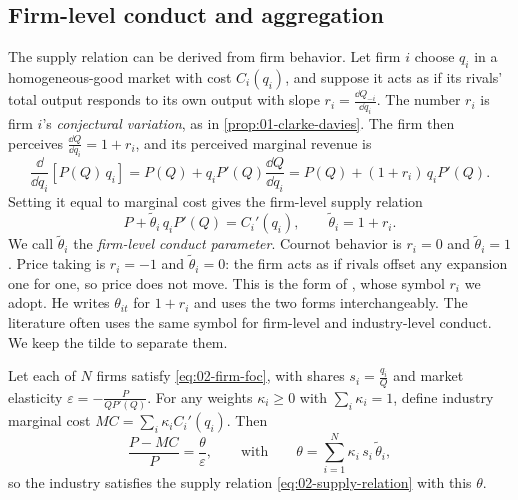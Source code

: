 \subsection{Firm-level conduct and aggregation}\label{sec:02-aggregation}

The supply relation can be derived from firm behavior. Let firm $i$ choose $q_i$ in a homogeneous-good market with
cost $C_i(q_i)$, and suppose it acts as if its rivals' total output responds to its own output with slope
$r_i = \frac{\dd Q_{-i}}{\dd q_i}$. The number $r_i$ is firm $i$'s \emph{conjectural variation}, as in
\cref{prop:01-clarke-davies}. The firm then perceives $\frac{\dd Q}{\dd q_i} = 1 + r_i$, and its perceived marginal
revenue is
\begin{equation*}
\frac{\dd}{\dd q_i}\left[P(Q)\, q_i\right] = P(Q) + q_i P'(Q)\frac{\dd Q}{\dd q_i} = P(Q) + (1 + r_i)\, q_i P'(Q) .
\end{equation*}
Setting it equal to marginal cost gives the firm-level supply relation
\begin{equation}\label{eq:02-firm-foc}
P + \tilde\theta_i\, q_i P'(Q) = C_i'(q_i), \qquad \tilde\theta_i = 1 + r_i .
\end{equation}
We call $\tilde\theta_i$ the \emph{firm-level conduct parameter}. Cournot behavior is $r_i = 0$ and
$\tilde\theta_i = 1$. Price taking is $r_i = -1$ and $\tilde\theta_i = 0$: the firm acts as if rivals offset any
expansion one for one, so price does not move. This is the form of \citet[eqs.~(12) and (14),
pp.~1027--1028]{Bresnahan1989}, whose symbol $r_i$ we adopt. He writes $\theta_{it}$ for $1 + r_i$ and uses the two
forms interchangeably. The literature often uses the same symbol for firm-level and industry-level conduct. We keep
the tilde to separate them.

\begin{proposition}\label{prop:02-theta-aggregate}
Let each of $N$ firms satisfy \eqref{eq:02-firm-foc}, with shares $s_i = \frac{q_i}{Q}$ and market elasticity
$\varepsilon = -\frac{P}{Q P'(Q)}$. For any weights $\kappa_i \ge 0$ with $\sum_i \kappa_i = 1$, define industry
marginal cost $MC = \sum_i \kappa_i C_i'(q_i)$. Then
\begin{equation}\label{eq:02-theta-aggregate}
\frac{P - MC}{P} = \frac{\theta}{\varepsilon}, \qquad\text{with}\qquad \theta = \sum_{i=1}^N \kappa_i\, s_i\,
\tilde\theta_i ,
\end{equation}
so the industry satisfies the supply relation \eqref{eq:02-supply-relation} with this $\theta$.
\end{proposition}

